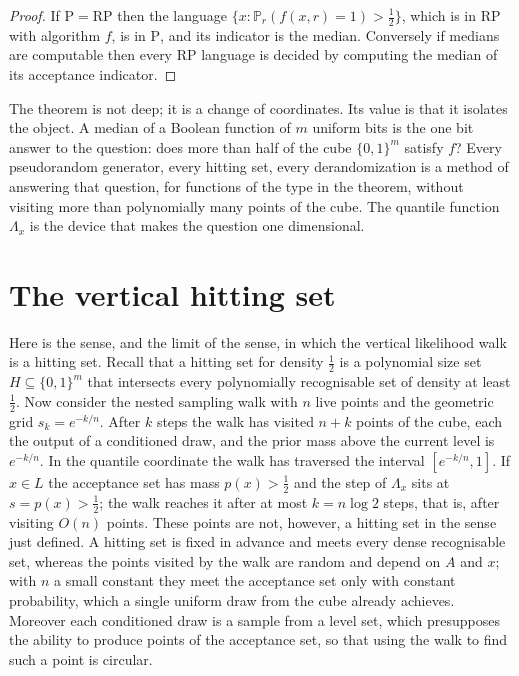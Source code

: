 \documentclass[11pt,twoside,openany]{book}
\theoremstyle{plain}
\theoremstyle{definition}
\theoremstyle{remark}
\newcommand{\PP}{\mathbb{P}}
\newcommand{\RP}{\mathrm{RP}}
\newcommand{\Pc}{\mathrm{P}}
\begin{document}
\begin{proof}
If $\Pc = \RP$ then the language $\{ x : \PP_r(f(x,r) = 1) > \tfrac12 \}$, which is in $\RP$ with algorithm $f$, is in $\Pc$, and its indicator is the median. Conversely if medians are computable then every $\RP$ language is decided by computing the median of its acceptance indicator.
\end{proof}

The theorem is not deep; it is a change of coordinates. Its value is that it isolates the object. A median of a Boolean function of $m$ uniform bits is the one bit answer to the question: does more than half of the cube $\{0,1\}^m$ satisfy $f$? Every pseudorandom generator, every hitting set, every derandomization is a method of answering that question, for functions of the type in the theorem, without visiting more than polynomially many points of the cube. The quantile function $\Lambda_x$ is the device that makes the question one dimensional.

\section{The vertical hitting set}

Here is the sense, and the limit of the sense, in which the vertical likelihood walk is a hitting set. Recall that a hitting set for density $\tfrac12$ is a polynomial size set $H \subseteq \{0,1\}^m$ that intersects every polynomially recognisable set of density at least $\tfrac12$. Now consider the nested sampling walk with $n$ live points and the geometric grid $s_k = e^{-k/n}$. After $k$ steps the walk has visited $n + k$ points of the cube, each the output of a conditioned draw, and the prior mass above the current level is $e^{-k/n}$. In the quantile coordinate the walk has traversed the interval $[e^{-k/n}, 1]$. If $x \in L$ the acceptance set has mass $p(x) > \tfrac12$ and the step of $\Lambda_x$ sits at $s = p(x) > \tfrac12$; the walk reaches it after at most $k = n \log 2$ steps, that is, after visiting $O(n)$ points. These points are not, however, a hitting set in the sense just defined. A hitting set is fixed in advance and meets every dense recognisable set, whereas the points visited by the walk are random and depend on $A$ and $x$; with $n$ a small constant they meet the acceptance set only with constant probability, which a single uniform draw from the cube already achieves. Moreover each conditioned draw is a sample from a level set, which presupposes the ability to produce points of the acceptance set, so that using the walk to find such a point is circular.
\end{document}
